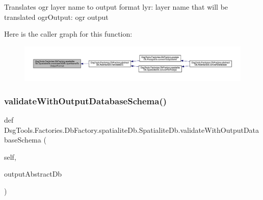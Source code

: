 \begin{DoxyVerb}Translates ogr layer name to output format
lyr: layer name that will be translated
ogrOutput: ogr output
\end{DoxyVerb}
 Here is the caller graph for this function\+:
\nopagebreak
\begin{figure}[H]
\begin{center}
\leavevmode
\includegraphics[width=350pt]{class_dsg_tools_1_1_factories_1_1_db_factory_1_1spatialite_db_1_1_spatialite_db_ae4ad7af93f5880d53ef2a3ca5e9fefcc_icgraph}
\end{center}
\end{figure}
\mbox{\label{class_dsg_tools_1_1_factories_1_1_db_factory_1_1spatialite_db_1_1_spatialite_db_ae6063c531bf964bc1ffb392c2324fa89}} 
\subsubsection{\texorpdfstring{validate\+With\+Output\+Database\+Schema()}{validateWithOutputDatabaseSchema()}}
{\footnotesize\ttfamily def Dsg\+Tools.\+Factories.\+Db\+Factory.\+spatialite\+Db.\+Spatialite\+Db.\+validate\+With\+Output\+Database\+Schema (\begin{DoxyParamCaption}\item[{}]{self,  }\item[{}]{output\+Abstract\+Db }\end{DoxyParamCaption})}

